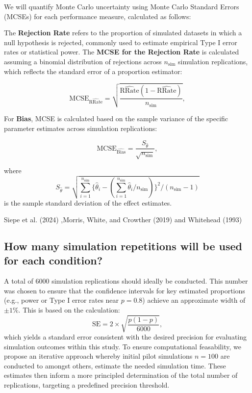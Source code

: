 \documentclass[
  man,
  floatsintext]{apa7}
\begin{document}
We will quantify Monte Carlo uncertainty using Monte Carlo Standard
Errors (MCSEs) for each performance measure, calculated as follows:

The \textbf{Rejection Rate} refers to the proportion of simulated
datasets in which a null hypothesis is rejected, commonly used to
estimate empirical Type I error rates or statistical power. The
\textbf{MCSE for the Rejection Rate} is calculated assuming a binomial
distribution of rejections across \(n_{\text{sim}}\) simulation
replications, which reflects the standard error of a proportion
estimator:

\[
\text{MCSE}_{\widehat{\text{RRate}}} = \sqrt{\frac{\widehat{\text{RRate}} (1 - \widehat{\text{RRate}})}{n_{\text{sim}}}},
\]

For \textbf{Bias}, MCSE is calculated based on the sample variance of
the specific parameter estimates across simulation replications:

\[
\text{MCSE}_{\widehat{\text{Bias}}} = \frac{S_{\hat{\theta}}}{\sqrt{n_{\text{sim}}}},
\]

where \[
S_{\hat{\theta}} = \sqrt{\sum_{i=1}^{n_{\text{sim}}}{ \{\hat{\theta}_i - (\sum_{i=1}^{n_{\text{sim}}}\hat{\theta}_i/n_{\text{sim}})\}^2}/(n_{\text{sim}} - 1)}
\] is the sample standard deviation of the effect estimates.

Siepe et al. (2024) ,Morris, White, and Crowther (2019) and Whitehead
(1993)

\subsection{How many simulation repetitions will be used for each
condition?}\label{how-many-simulation-repetitions-will-be-used-for-each-condition}

A total of 6000 simulation replications should ideally be conducted.
This number was chosen to ensure that the confidence intervals for key
estimated proportions (e.g., power or Type I error rates near
\(p = 0.8\)) achieve an approximate width of \(\pm 1\%\). This is based
on the calculation: \[
\text{SE} = 2 \times \sqrt{\frac{p(1-p)}{6000}},
\] which yields a standard error consistent with the desired precision
for evaluating simulation outcomes within this study. To ensure
computational feasability, we propose an iterative approach whereby
initial pilot simulations \(n=100\) are conducted to amongst others,
estimate the needed simulation time. These estimates then inform a more
principled determination of the total number of replications, targeting
a predefined precision threshold.
\end{document}
